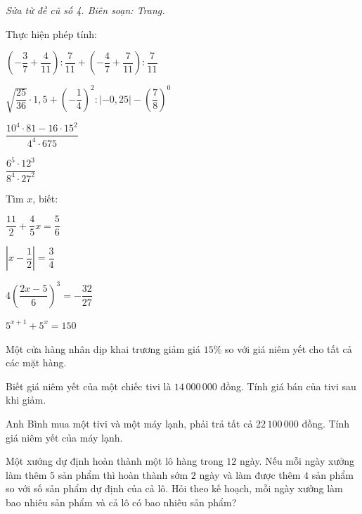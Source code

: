 \noindent\textit{Sửa từ đề cũ số 4. Biên soạn: Trang.}

\begin{bt}[2,0 điểm]
Thực hiện phép tính:
\begin{listEX}[1]
\item $\left(-\dfrac{3}{7}+\dfrac{4}{11}\right):\dfrac{7}{11}+\left(-\dfrac{4}{7}+\dfrac{7}{11}\right):\dfrac{7}{11}$
\item $\sqrt{\dfrac{25}{36}}\cdot 1{,}5+\left(-\dfrac{1}{4}\right)^{2}:\left|-0{,}25\right|-\left(\dfrac{7}{8}\right)^{0}$
\item $\dfrac{10^{4}\cdot 81-16\cdot 15^{2}}{4^{4}\cdot 675}$
\item $\dfrac{6^{5}\cdot 12^{3}}{8^{4}\cdot 27^{2}}$
\end{listEX}
\end{bt}

\begin{bt}[2,0 điểm]
Tìm $x$, biết:
\begin{listEX}[2]
\item $\dfrac{11}{2}+\dfrac{4}{5}x=\dfrac{5}{6}$
\item $\left|x-\dfrac{1}{2}\right|=\dfrac{3}{4}$
\item $4\left(\dfrac{2x-5}{6}\right)^{3}=-\dfrac{32}{27}$
\item $5^{x+1}+5^{x}=150$
\end{listEX}
\end{bt}

\begin{bt}[1,0 điểm]
Một cửa hàng nhân dịp khai trương giảm giá $15\%$ so với giá niêm yết cho tất cả các mặt hàng.
\begin{listEX}[1]
\item Biết giá niêm yết của một chiếc tivi là $14\,000\,000$ đồng. Tính giá bán của tivi sau khi giảm.
\item Anh Bình mua một tivi và một máy lạnh, phải trả tất cả $22\,100\,000$ đồng. Tính giá niêm yết của máy lạnh.
\end{listEX}
\end{bt}

\begin{bt}[1,0 điểm]
Một xưởng dự định hoàn thành một lô hàng trong $12$ ngày. Nếu mỗi ngày xưởng làm thêm $5$ sản phẩm thì hoàn thành sớm $2$ ngày và làm được thêm $4$ sản phẩm so với số sản phẩm dự định của cả lô. Hỏi theo kế hoạch, mỗi ngày xưởng làm bao nhiêu sản phẩm và cả lô có bao nhiêu sản phẩm?
\end{bt}

